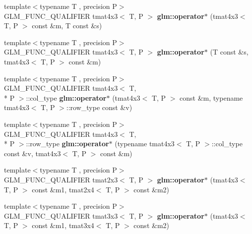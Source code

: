 \begin{DoxyCompactItemize}
\item 
\hypertarget{namespaceglm_a4e17c31ba0dc7ad185b218ee3dda2195}{{\footnotesize template$<$typename T , precision P$>$ }\\G\-L\-M\-\_\-\-F\-U\-N\-C\-\_\-\-Q\-U\-A\-L\-I\-F\-I\-E\-R tmat4x3$<$ T, P $>$ {\bfseries glm\-::operator$\ast$} (tmat4x3$<$ T, P $>$ const \&m, T const \&s)}\label{namespaceglm_a4e17c31ba0dc7ad185b218ee3dda2195}

\item 
\hypertarget{namespaceglm_ae2f835ca42b71dfa2f26d44560209da6}{{\footnotesize template$<$typename T , precision P$>$ }\\G\-L\-M\-\_\-\-F\-U\-N\-C\-\_\-\-Q\-U\-A\-L\-I\-F\-I\-E\-R tmat4x3$<$ T, P $>$ {\bfseries glm\-::operator$\ast$} (T const \&s, tmat4x3$<$ T, P $>$ const \&m)}\label{namespaceglm_ae2f835ca42b71dfa2f26d44560209da6}

\item 
\hypertarget{namespaceglm_ab8bb5a16d976817057cca7d1ec66733c}{{\footnotesize template$<$typename T , precision P$>$ }\\G\-L\-M\-\_\-\-F\-U\-N\-C\-\_\-\-Q\-U\-A\-L\-I\-F\-I\-E\-R tmat4x3$<$ T, \\*
P $>$\-::col\-\_\-type {\bfseries glm\-::operator$\ast$} (tmat4x3$<$ T, P $>$ const \&m, typename tmat4x3$<$ T, P $>$\-::row\-\_\-type const \&v)}\label{namespaceglm_ab8bb5a16d976817057cca7d1ec66733c}

\item 
\hypertarget{namespaceglm_a214d9119a6b9cf32b547306ebf2b96bb}{{\footnotesize template$<$typename T , precision P$>$ }\\G\-L\-M\-\_\-\-F\-U\-N\-C\-\_\-\-Q\-U\-A\-L\-I\-F\-I\-E\-R tmat4x3$<$ T, \\*
P $>$\-::row\-\_\-type {\bfseries glm\-::operator$\ast$} (typename tmat4x3$<$ T, P $>$\-::col\-\_\-type const \&v, tmat4x3$<$ T, P $>$ const \&m)}\label{namespaceglm_a214d9119a6b9cf32b547306ebf2b96bb}

\item 
\hypertarget{namespaceglm_af9121f804d71e079cbe1349c6715e869}{{\footnotesize template$<$typename T , precision P$>$ }\\G\-L\-M\-\_\-\-F\-U\-N\-C\-\_\-\-Q\-U\-A\-L\-I\-F\-I\-E\-R tmat2x3$<$ T, P $>$ {\bfseries glm\-::operator$\ast$} (tmat4x3$<$ T, P $>$ const \&m1, tmat2x4$<$ T, P $>$ const \&m2)}\label{namespaceglm_af9121f804d71e079cbe1349c6715e869}

\item 
\hypertarget{namespaceglm_a1364c0e61de6a2c9a51c10c390cb0d99}{{\footnotesize template$<$typename T , precision P$>$ }\\G\-L\-M\-\_\-\-F\-U\-N\-C\-\_\-\-Q\-U\-A\-L\-I\-F\-I\-E\-R tmat3x3$<$ T, P $>$ {\bfseries glm\-::operator$\ast$} (tmat4x3$<$ T, P $>$ const \&m1, tmat3x4$<$ T, P $>$ const \&m2)}\label{namespaceglm_a1364c0e61de6a2c9a51c10c390cb0d99}


\end{DoxyCompactItemize}
